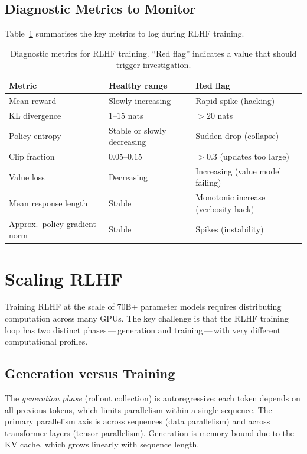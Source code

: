 \subsection{Diagnostic Metrics to Monitor}
\label{sec:diagnostics}

Table~\ref{tab:diagnostics} summarises the key metrics to log during RLHF training.

\begin{table}[ht]
\centering
{\footnotesize
\begin{tabular}{@{}lll@{}}
\toprule
\textbf{Metric} & \textbf{Healthy range} & \textbf{Red flag} \\
\midrule
Mean reward & Slowly increasing & Rapid spike (hacking) \\
KL divergence & $1$--$15$ nats & $> 20$ nats \\
Policy entropy & Stable or slowly decreasing & Sudden drop (collapse) \\
Clip fraction & $0.05$--$0.15$ & $> 0.3$ (updates too large) \\
Value loss & Decreasing & Increasing (value model failing) \\
Mean response length & Stable & Monotonic increase (verbosity hack) \\
Approx.\ policy gradient norm & Stable & Spikes (instability) \\
\bottomrule
\end{tabular}
}
\caption{Diagnostic metrics for RLHF training. ``Red flag'' indicates a value that should trigger investigation.}
\label{tab:diagnostics}
\end{table}

\section{Scaling RLHF}
\label{sec:scaling-rlhf}

Training RLHF at the scale of 70B+ parameter models requires distributing computation across many GPUs. The key challenge is that the RLHF training loop has two distinct phases\,---\,generation and training\,---\,with very different computational profiles.

\subsection{Generation versus Training}

The \emph{generation phase} (rollout collection) is autoregressive: each token depends on all previous tokens, which limits parallelism within a single sequence. The primary parallelism axis is across sequences (data parallelism) and across transformer layers (tensor parallelism). Generation is memory-bound due to the KV cache, which grows linearly with sequence length.

